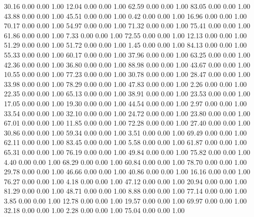    30.16   0.00   0.00   1.00
   12.04   0.00   0.00   1.00
   62.59   0.00   0.00   1.00
   83.05   0.00   0.00   1.00
   43.88   0.00   0.00   1.00
   45.51   0.00   0.00   1.00
    0.42   0.00   0.00   1.00
   16.96   0.00   0.00   1.00
   70.17   0.00   0.00   1.00
   54.97   0.00   0.00   1.00
   71.32   0.00   0.00   1.00
   75.41   0.00   0.00   1.00
   61.86   0.00   0.00   1.00
    7.33   0.00   0.00   1.00
   72.55   0.00   0.00   1.00
   12.13   0.00   0.00   1.00
   51.29   0.00   0.00   1.00
   51.72   0.00   0.00   1.00
    1.45   0.00   0.00   1.00
   84.13   0.00   0.00   1.00
   55.33   0.00   0.00   1.00
   60.17   0.00   0.00   1.00
   37.96   0.00   0.00   1.00
   63.25   0.00   0.00   1.00
   42.36   0.00   0.00   1.00
   36.80   0.00   0.00   1.00
   88.98   0.00   0.00   1.00
   43.67   0.00   0.00   1.00
   10.55   0.00   0.00   1.00
   77.23   0.00   0.00   1.00
   30.78   0.00   0.00   1.00
   28.47   0.00   0.00   1.00
   33.98   0.00   0.00   1.00
   78.29   0.00   0.00   1.00
   47.83   0.00   0.00   1.00
    2.26   0.00   0.00   1.00
   22.35   0.00   0.00   1.00
   65.13   0.00   0.00   1.00
   38.91   0.00   0.00   1.00
   23.53   0.00   0.00   1.00
   17.05   0.00   0.00   1.00
   19.30   0.00   0.00   1.00
   44.54   0.00   0.00   1.00
    2.97   0.00   0.00   1.00
   33.54   0.00   0.00   1.00
   32.10   0.00   0.00   1.00
   24.72   0.00   0.00   1.00
   23.80   0.00   0.00   1.00
   67.01   0.00   0.00   1.00
   11.85   0.00   0.00   1.00
   72.28   0.00   0.00   1.00
   27.40   0.00   0.00   1.00
   30.86   0.00   0.00   1.00
   59.34   0.00   0.00   1.00
    3.51   0.00   0.00   1.00
   69.49   0.00   0.00   1.00
   62.11   0.00   0.00   1.00
   83.45   0.00   0.00   1.00
    5.58   0.00   0.00   1.00
   61.87   0.00   0.00   1.00
   65.31   0.00   0.00   1.00
   76.19   0.00   0.00   1.00
   49.84   0.00   0.00   1.00
   75.82   0.00   0.00   1.00
    4.40   0.00   0.00   1.00
   68.29   0.00   0.00   1.00
   60.84   0.00   0.00   1.00
   78.70   0.00   0.00   1.00
   29.78   0.00   0.00   1.00
   46.66   0.00   0.00   1.00
   40.86   0.00   0.00   1.00
   16.16   0.00   0.00   1.00
   76.27   0.00   0.00   1.00
    4.18   0.00   0.00   1.00
   47.12   0.00   0.00   1.00
   20.94   0.00   0.00   1.00
   81.29   0.00   0.00   1.00
   48.71   0.00   0.00   1.00
    8.88   0.00   0.00   1.00
   77.14   0.00   0.00   1.00
    3.85   0.00   0.00   1.00
   12.78   0.00   0.00   1.00
   19.57   0.00   0.00   1.00
   69.97   0.00   0.00   1.00
   32.18   0.00   0.00   1.00
    2.28   0.00   0.00   1.00
   75.04   0.00   0.00   1.00
